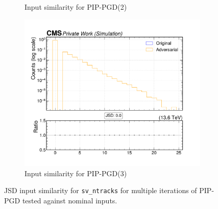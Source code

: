 \begin{figure}[htbp]
\begin{subfigure}[t]{0.32\textwidth}
    \caption*{Input similarity for PIP-PGD(2)}
  \end{subfigure}\hfill
  \begin{subfigure}[t]{0.32\textwidth}
    \includegraphics[width=\linewidth]{media/output/features/compare/combined_it_3/cmp_vtx_arr_sv_ntracks.pdf}
    \caption*{Input similarity for PIP-PGD(3)}
  \end{subfigure}

  \caption*{JSD input similarity for \texttt{sv\_ntracks} for multiple iterations of PIP-PGD tested against nominal inputs.}
  \label{fig:combined_input_sv_ntracks}
\end{figure}

